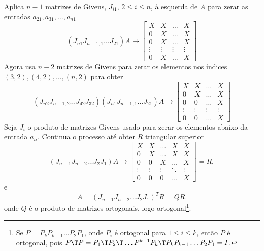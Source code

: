 \documentclass{article}
\begin{document}
\begin{tcolorbox}[title=Algoritmo da decomposição QR de Givens]
    Aplica \(n-1\) matrizes de Givens, \(J_{i1}\), \(2 \leq i \leq n\), à esquerda de \(A\) para zerar as entradas \(a_{21}, a_{31}, \ldots, a_{n1}\)
    \[
        (J_{n1}J_{n-1,1}\ldots J_{21})A \to \begin{bmatrix}
            X & X & \ldots & X \\
            0 & X & \ldots & X \\
            0 & X & \ldots & X \\
            \vdots & \vdots & \vdots & \vdots \\
            0 & X & \ldots & X
        \end{bmatrix}
    \]
    Agora usa \(n-2\) matrizes de Givens para zerar os elementos nos índices \((3,2), (4,2), \ldots, (n,2)\) para obter
    \[
        (J_{n2}J_{n-1,2}\ldots J_{42}J_{32})(J_{n1}J_{n-1,1}\ldots J_{21})A \to \begin{bmatrix}
            X & X & \ldots & X \\
            0 & X & \ldots & X \\
            0 & 0 & \ldots & X \\
            \vdots & \vdots & \vdots & \vdots \\
            0 & 0 & \ldots & X
        \end{bmatrix}
    \]
    Seja \(J_i\) o produto de matrizes Givens usado para zerar os elementos abaixo da entrada \(a_{ii}\). Continua o processo até obter \(R\) triangular superior
    \[
        (J_{n-1}J_{n-2}\ldots J_2 J_1)A \to \begin{bmatrix}
            X & X & \ldots & X & X \\
            0 & X & \ldots & X & X \\
            0 & 0 & X & \ldots & X \\
            \vdots & \vdots & \vdots & \ddots & \vdots \\
            0 & 0 & 0 & \ldots & X
        \end{bmatrix} = R,
    \]
    e 
    \[
        A = (J_{n-1}J_{n-2}\ldots J_2 J_1)^{T}R = Q R.
    \]
    onde \(Q\) é o produto de matrizes ortogonais, logo ortogonal\footnote{Se \(P=P_k P_{k-1}\ldots P_2 P_1\), onde \(P_i\) é ortogonal para \(1 \leq i \leq k\), então \(P\) é ortogonal, pois \(P\T  P = P_1\T  P_2\T  \ldots P^{k-1} P_k\T  P_k P_{k-1} \ldots P_2 P_1 = I\).}.
\end{tcolorbox}
\end{document}
